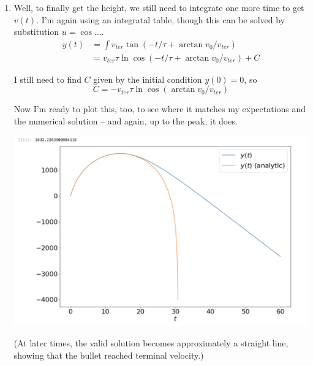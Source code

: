 \documentclass[12pt]{article}
\begin{document}
\begin{enumerate}
\begin{enumerate}
{\begin{enumerate}
                          The good news is that the analytic solution we just got matches the numerical simulation, up to the time where velocity slowed down to zero, ie., the peak. After that, velocity becomes negative, so drag should now be positive, but actually that's not the case in the ODE we're solving since we assumed velocity is up (positive). In the numerical solution, I did account for this, but our analytic solution just becomes invalid. It doesn't matter, since we're trying to find the peak height.

                    \item Well, to finally get the height, we still need to integrate one more time to get $v(t)$. I'm again using an integratal table, though this can be solved by substitution $u = \cos \ldots$.
                          \begin{align*}
                            y(t) & = \int v_{ter} \tan (-t/\tau + \arctan v_0/v_{ter})         \\
                                 & = v_{ter} \tau \ln \cos (-t/\tau + \arctan v_0/v_{ter}) + C
                          \end{align*}

                          I still need to find $C$ given by the initial condition $y(0) = 0$, so
                          $$
                            C = - v_{ter} \tau \ln \cos (\arctan v_0/v_{ter})
                          $$

                          Now I'm ready to plot this, too, to see where it matches my expectations and the numerical solution -- and again, up to the peak, it does.

                          \includegraphics[width=.6\textwidth]{bullet_y.png}

                          (At later times, the valid solution becomes approximately a straight line, showing that the bullet reached terminal velocity.)


\end{enumerate}}
\end{enumerate}
\end{enumerate}
\end{document}
